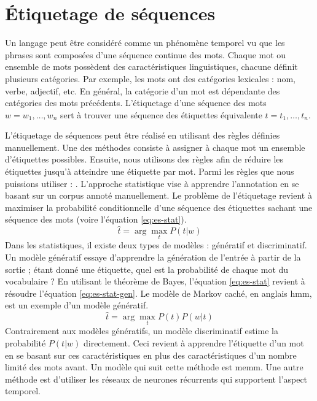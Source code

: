 \documentclass{KodeBook}
\begin{document}
\section{Étiquetage de séquences}

Un langage peut être considéré comme un phénomène temporel vu que les phrases sont composées d'une séquence continue des mots.
Chaque mot ou ensemble de mots possèdent des caractéristiques linguistiques, chacune définit plusieurs catégories. 
Par exemple, les mots ont des catégories lexicales : nom, verbe, adjectif, etc.
En général, la catégorie d'un mot est dépendante des catégories des mots précédents.
L'étiquetage d'une séquence des mots $w = w_1, \ldots, w_n$ sert à trouver une séquence des étiquettes équivalente $t = t_1, \ldots, t_n$. 

L'étiquetage de séquences peut être réalisé en utilisant des règles définies manuellement. 
Une des méthodes consiste à assigner à chaque mot un ensemble d'étiquettes possibles. 
Ensuite, nous utilisons des règles afin de réduire les étiquettes jusqu'à atteindre une étiquette par mot.
Parmi les règles que nous puissions utiliser : . 
L'approche statistique vise à apprendre l'annotation en se basant sur un corpus annoté manuellement. 
Le problème de l'étiquetage revient à maximiser la probabilité conditionnelle d'une séquence des étiquettes sachant une séquence des mots (voire l'équation \ref{eq:es-stat}).
\begin{equation}\label{eq:es-stat}
	\hat{t} = \arg\max\limits_t P(t | w)
\end{equation}
Dans les statistiques, il existe deux types de modèles : génératif et discriminatif. 
Un modèle génératif essaye d'apprendre la génération de l'entrée à partir de la sortie ; étant donné une étiquette, quel est la probabilité de chaque mot du vocabulaire ?
En utilisant le théorème de Bayes, l'équation \ref{eq:es-stat} revient à résoudre l'équation \ref{eq:es-stat-gen}.
Le modèle de Markov caché, en anglais \ac{hmm}, est un exemple d'un modèle génératif.
\begin{equation}\label{eq:es-stat-gen}
	\hat{t} = \arg\max\limits_t P(t) P(w | t) 
\end{equation}
Contrairement aux modèles génératifs, un modèle discriminatif estime la probabilité $P(t | w)$ directement. 
Ceci revient à apprendre l'étiquette d'un mot en se basant sur ces caractéristiques en plus des caractéristiques d'un nombre limité des mots avant.
Un modèle qui suit cette méthode est \ac{memm}.
Une autre méthode est d'utiliser les réseaux de neurones récurrents qui supportent l'aspect temporel. 
\end{document}
